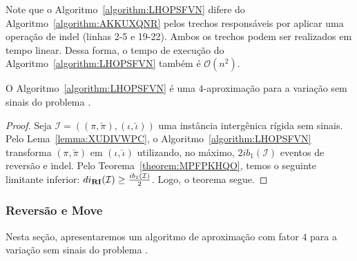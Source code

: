 Note que o Algoritmo~\ref{algorithm:LHOPSFVN} difere do Algoritmo~\ref{algorithm:AKKUXQNR} pelos trechos responsáveis por aplicar uma operação de indel (linhas 2-5 e 19-22). Ambos os trechos podem ser realizados em tempo linear. Dessa forma, o tempo de execução do Algoritmo~\ref{algorithm:LHOPSFVN} também é $\mathcal{O}(n^2)$.

\begin{theorem}\label{theorem:AFAHUIUF}
O Algoritmo~\ref{algorithm:LHOPSFVN} é uma $4$-aproximação para a variação sem sinais do problema \SbIRI{}.
\end{theorem}
\begin{proof}
Seja $\mathcal{I} = ((\pi,\breve\pi),(\iota,\breve\iota))$ uma instância intergênica rígida sem sinais. Pelo Lema~\ref{lemma:XUDIVWPC}, o Algoritmo~\ref{algorithm:LHOPSFVN} transforma $(\pi,\breve\pi)$ em $(\iota,\breve\iota)$ utilizando, no máximo, $2ib_1(\mathcal{I})$ eventos de reversão e indel. Pelo Teorema~\ref{theorem:MPFPKHQO}, temos o seguinte limitante inferior: $di_{\textbf{RI}}(\mathcal{I}) \ge \frac{ib_1(\mathcal{I})}{2}$. Logo, o teorema segue. 
\end{proof}

\subsubsection{Reversão e Move}

Nesta seção, apresentaremos um algoritmo de aproximação com fator $4$ para a variação sem sinais do problema \SbIRM{}.

